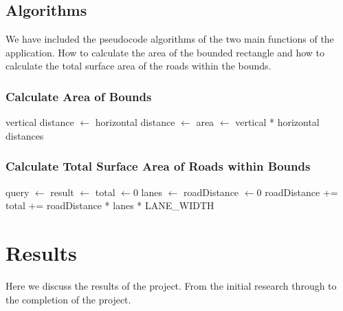 \documentclass[a4paper,11pt]{article}
\begin{document}
\subsection{Algorithms}

We have included the pseudocode algorithms of the two main functions of the
application. How to calculate the area of the bounded rectangle and how to
calculate the total surface area of the roads within the bounds.

\subsubsection{Calculate Area of Bounds}

\begin{samepage}
\begin{algorithmic}
    \State{} vertical distance $\gets$ 
    \State{} horizontal distance $\gets$
    \State{} area $\gets$ vertical * horizontal distances
    \State{} 
  \EndFunction{}
\end{algorithmic}
\end{samepage}

\subsubsection{Calculate Total Surface Area of Roads within Bounds}

\begin{samepage}
\begin{algorithmic}
    \State{} query $\gets$ 
    \State{} result $\gets$ 
    \State{} total $\gets 0$
      \State{} lanes $\gets$ 
      \State{} roadDistance $\gets 0$
        \State{} roadDistance += 
      \EndFor{}
      \State{} total += roadDistance * lanes * LANE\_WIDTH
    \EndFor{}
    \State{} 
  \EndFunction{}
\end{algorithmic}
\end{samepage}

\section{Results}

Here we discuss the results of the project. From the initial research through to
the completion of the project.
\end{document}

